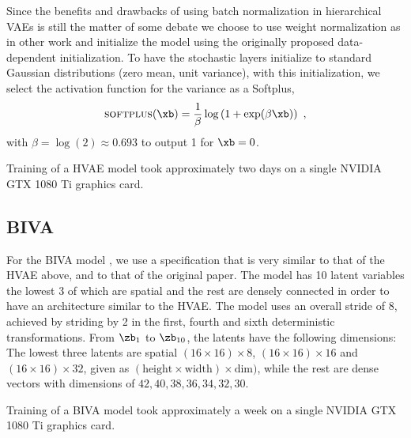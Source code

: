 {Since the benefits and drawbacks of using batch normalization \cite{ioffe_batch_2015} in hierarchical VAEs is still the matter of some debate \cite{sonderby_ladder_2016, vahdat_nvae_2020, child_very_2021} we choose to use weight normalization \cite{salimans_weight_2016} as in other work \cite{maaloe_biva_2019} and initialize the model using the originally proposed data-dependent initialization.
To have the stochastic layers initialize to standard Gaussian distributions (zero mean, unit variance), with this initialization, we select the activation function for the variance as a Softplus,
\begin{equation*}
    \textsc{softplus}(\xb) = \frac{1}{\beta}\log\left(1 + \exp(\beta\xb)\right) \ ,
\end{equation*}
with $\beta = \log(2) \approx 0.693$ to output 1 for $\xb = 0$.

Training of a HVAE model took approximately two days on a single NVIDIA GTX 1080 Ti graphics card.


\subsection{BIVA}
For the BIVA model \cite{maaloe_biva_2019}, we use a specification that is very similar to that of the HVAE above, and to that of the original paper.
The model has 10 latent variables the lowest 3 of which are spatial and the rest are densely connected in order to have an architecture similar to the HVAE.
The model uses an overall stride of 8, achieved by striding by 2 in the first, fourth and sixth deterministic transformations.
From $\zb_1$ to $\zb_{10}$, the latents have the following dimensions: The lowest three latents are spatial $(16\times16)\times8$, $(16\times16)\times16$ and $(16\times16)\times32$, given as $(\text{height}\times\text{width})\times\text{dim})$, while the rest are dense vectors with dimensions of $42, 40, 38, 36, 34, 32, 30$.

Training of a BIVA model took approximately a week on a single NVIDIA GTX 1080 Ti graphics card.


}
